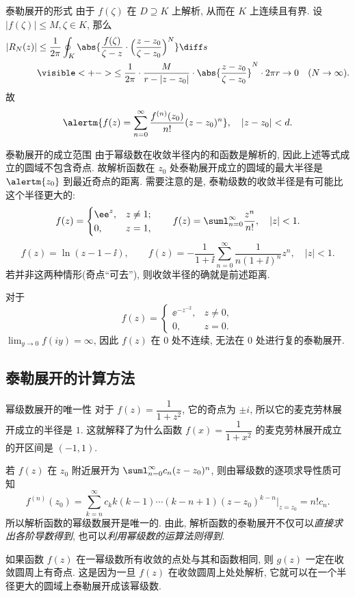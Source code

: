 \begin{frame}{泰勒展开的形式}
	\onslide<+->
	由于 $f(\zeta)$ 在 $D\supseteq K$ 上解析, 从而在 $K$ 上连续且有界.
	\onslide<+->
	设 $|f(\zeta)|\le M,\zeta\in K$,
	\onslide<+->
	那么
	\begin{align*}
		|R_N(z)|&\le\frac 1{2\pi}\oint_K\abs{\frac{f(\zeta)}{\zeta-z}\cdot\Bigl(\frac{z-z_0}{\zeta-z_0}\Bigr)^N}\diff s\\
		&\visible<+->{\le\frac 1{2\pi}\cdot \frac M{r-|z-z_0|}\cdot\abs{\frac{z-z_0}{\zeta-z_0}}^N\cdot 2\pi r\to 0\quad (N\to\infty).}
	\end{align*}
	\onslide<+->
	故
	\[\alertm{f(z)=\sum_{n=0}^\infty\frac{f^{(n)}(z_0)}{n!}(z-z_0)^n},\quad |z-z_0|<d.
	\]
\end{frame}


\begin{frame}{泰勒展开的成立范围}
	\onslide<+->
	由于幂级数在收敛半径内的和函数是解析的, 因此上述等式成立的圆域不包含奇点.
	\onslide<+->
	故解析函数在 $z_0$ 处\alert{泰勒展开成立的圆域的最大半径是 $\alertm{z_0}$ 到最近奇点的距离}.
	\onslide<+->
	需要注意的是, 泰勒级数的收敛半径是有可能比这个半径更大的:
	\[f(z)=\begin{cases}
	\ee^z,&z\neq 1;\\ 0,&z=1,
	\end{cases}\qquad f(z)=\suml_{n=0}^\infty \dfrac{z^n}{n!},\quad |z|<1.
	\]
	\onslide<+->
	\[f(z)=\ln(z-1-\ii ),\qquad f(z)=-\frac1{1+\ii}\sum_{n=0}^\infty\frac1{n(1+\ii)^n}z^n,\quad |z|<1.
	\]
	\onslide<+->
	若并非这两种情形(奇点``可去''), 则收敛半径的确就是前述距离.

	\onslide<+->
	对于
	\[f(z)=\begin{cases}
	\ee^{-z^{-2}},&z\neq 0,\\
	0,&z=0.\end{cases}
	\]
	\onslide<+->
	$\lim_{y\to 0}f(iy)=\infty$, 因此 $f(z)$ 在 $0$ 处不连续, 无法在 $0$ 处进行复的泰勒展开.
\end{frame}


\subsection{泰勒展开的计算方法}
\begin{frame}{幂级数展开的唯一性}
	\onslide<+->
	对于 $f(z)=\dfrac1{1+z^2}$,
	\onslide<+->
	它的奇点为 $\pm i$, 所以它的麦克劳林展开成立的半径是 $1$.
	\onslide<+->
	这就解释了为什么函数 $f(x)=\dfrac1{1+x^2}$ 的麦克劳林展开成立的开区间是 $(-1,1)$.

	\onslide<+->
	若 $f(z)$ 在 $z_0$ 附近展开为 $\suml_{n=0}^\infty c_n(z-z_0)^n$,
	\onslide<+->
	则由幂级数的逐项求导性质可知
	\[f^{(n)}(z_0)=\sum_{k=n}^\infty c_k k(k-1)\cdots(k-n+1)(z-z_0)^{k-n}\Big|_{z=z_0}=n!c_n.
	\]
	\onslide<+->
	所以\alert{解析函数的幂级数展开是唯一的}.
	\onslide<+->
	由此, 解析函数的泰勒展开不仅可以\emph{直接求出各阶导数得到}, 也可以\emph{利用幂级数的运算法则得到}.

	\onslide<+->
	如果函数 $f(z)$ 在一幂级数所有收敛的点处与其和函数相同, 则 $g(z)$ \alert{一定在收敛圆周上有奇点}.
	\onslide<+->
	这是因为一旦 $f(z)$ 在收敛圆周上处处解析, 它就可以在一个半径更大的圆域上泰勒展开成该幂级数.
\end{frame}


